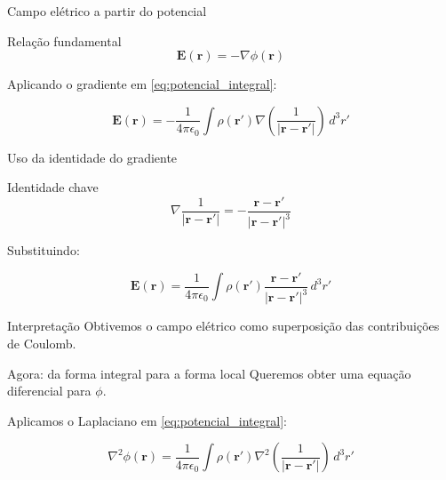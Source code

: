\documentclass[aspectratio=169]{beamer}
\begin{document}

\begin{frame}{Campo elétrico a partir do potencial}
\begin{block}{Relação fundamental}
\begin{equation}
\mathbf{E}(\mathbf{r}) = -\nabla \phi(\mathbf{r})
\label{eq:E_grad_phi}
\end{equation}
\end{block}

Aplicando o gradiente em \eqref{eq:potencial_integral}:

\begin{equation}
\mathbf{E}(\mathbf{r}) =
-\frac{1}{4\pi\epsilon_0}
\int \rho(\mathbf{r}')
\nabla \left( \frac{1}{|\mathbf{r}-\mathbf{r}'|} \right)
\, d^3 r'
\end{equation}

\end{frame}


\begin{frame}{Uso da identidade do gradiente}
\begin{block}{Identidade chave}
\begin{equation}
\nabla \frac{1}{|\mathbf{r}-\mathbf{r}'|}
=
-\frac{\mathbf{r}-\mathbf{r}'}{|\mathbf{r}-\mathbf{r}'|^3}
\label{eq:grad_green}
\end{equation}
\end{block}

Substituindo:

\begin{equation}
\mathbf{E}(\mathbf{r}) =
\frac{1}{4\pi\epsilon_0}
\int \rho(\mathbf{r}')
\frac{\mathbf{r}-\mathbf{r}'}{|\mathbf{r}-\mathbf{r}'|^3}
\, d^3 r'
\end{equation}

\begin{alertblock}{Interpretação}
Obtivemos o campo elétrico como superposição das contribuições de Coulomb.
\end{alertblock}

\end{frame}


\begin{frame}{Agora: da forma integral para a forma local}
Queremos obter uma equação diferencial para \(\phi\).

Aplicamos o Laplaciano em \eqref{eq:potencial_integral}:

\begin{equation}
\nabla^2 \phi(\mathbf{r}) =
\frac{1}{4\pi\epsilon_0}
\int \rho(\mathbf{r}')
\nabla^2 \left( \frac{1}{|\mathbf{r}-\mathbf{r}'|} \right)
\, d^3 r'
\end{equation}

\end{frame}
\end{document}
